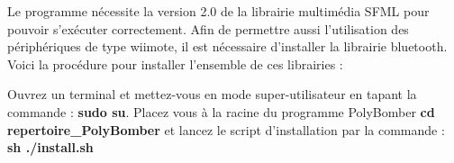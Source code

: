 
	Le programme nécessite la version 2.0 de la librairie multimédia SFML pour pouvoir s'exécuter correctement. Afin de permettre aussi l'utilisation des périphériques de type wiimote, il est nécessaire d'installer la librairie bluetooth. Voici la procédure pour installer l'ensemble de ces librairies :
	
	

Ouvrez un terminal et mettez-vous en mode super-utilisateur en tapant la commande : \textbf{sudo su}.
Placez vous à la racine du programme PolyBomber \textbf{cd repertoire\_PolyBomber} et lancez le script d'installation par la commande : \textbf{sh ./install.sh}
